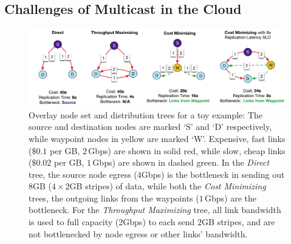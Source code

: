 \subsection{Challenges of Multicast in the Cloud}

\begin{figure}[t!]
    \centering
    \includegraphics[width=.85\linewidth]{figures/toy_example.pdf}
    \caption{\boldmath Overlay node set and distribution trees for a toy example:  The source and destination nodes are marked `S' and `D' respectively, while waypoint nodes in yellow are marked `W'. Expensive, fast links ($\$0.1$ per GB, $2$\,Gbps) are shown in solid red, while slow, cheap links ($\$0.02$ per GB, $1$\,Gbps) are shown in dashed green. In the \textit{Direct} tree, the source node egress (4Gbps) is the bottleneck in sending out 8GB ($4 \times 2$GB stripes) of data, while both the \textit{Cost Minimizing} trees, the outgoing links from the waypoints ($1$\,Gbps) are the bottleneck. For the \textit{Throughput Maximizing} tree, all link bandwidth is used to full capacity (2Gbps) to each send $2$GB stripes, and are not bottlenecked by node egress or other links' bandwidth. 
    } 
    \label{fig:toy_example}
\end{figure}

